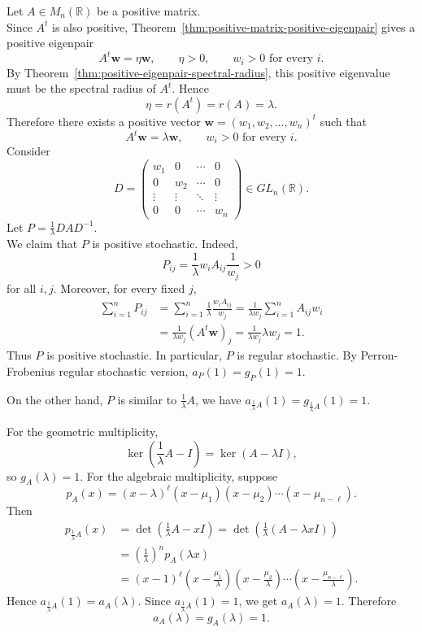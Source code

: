 \begin{pfbox}
Let $A\in M_n(\mathbb{R})$ be a positive matrix.\\
Since $A^t$ is also positive, Theorem~\eqref{thm:positive-matrix-positive-eigenpair} gives a positive eigenpair
\[
A^t\mathbf{w}
=
\eta\mathbf{w},
\qquad
\eta>0,
\qquad
w_i>0
\text{ for every }i.
\]
By Theorem~\eqref{thm:positive-eigenpair-spectral-radius}, this positive eigenvalue must be the spectral radius of $A^t$. Hence
\[
\eta
=
r(A^t)
=
r(A)
=
\lambda.
\]
Therefore there exists a positive vector $\mathbf{w}=(w_1,w_2,\dots,w_n)^t$ such that
\[
A^t\mathbf{w}
=
\lambda\mathbf{w},
\qquad
w_i>0
\text{ for every }i.
\]
Consider
\[
D
=
\begin{pmatrix}
w_1 & 0 & \cdots & 0\\
0 & w_2 & \cdots & 0\\
\vdots & \vdots & \ddots & \vdots\\
0 & 0 & \cdots & w_n
\end{pmatrix}
\in GL_n(\mathbb{R}).
\]
Let $P=\frac{1}{\lambda}DAD^{-1}$.\\
We claim that $P$ is positive stochastic. Indeed,
\[
P_{ij}
=
\frac{1}{\lambda}w_iA_{ij}\frac{1}{w_j}
>
0
\]
for all $i,j$. Moreover, for every fixed $j$,
\[
\begin{aligned}
\sum_{i=1}^n P_{ij}
&=
\sum_{i=1}^n \frac{1}{\lambda}\frac{w_iA_{ij}}{w_j}
=
\frac{1}{\lambda w_j}\sum_{i=1}^n A_{ij}w_i\\
&=
\frac{1}{\lambda w_j}(A^t\mathbf{w})_j
=
\frac{1}{\lambda w_j}\lambda w_j
=
1.
\end{aligned}
\]
Thus $P$ is positive stochastic. In particular, $P$ is regular stochastic. By Perron-Frobenius regular stochastic version, $a_P(1)=g_P(1)=1$.

On the other hand, $P$ is similar to $\frac{1}{\lambda}A$, we have $a_{\frac{1}{\lambda}A}(1)=g_{\frac{1}{\lambda}A}(1)=1$.

For the geometric multiplicity,
\[
\ker\left(\frac{1}{\lambda}A-I\right)
=
\ker(A-\lambda I),
\]
so $g_A(\lambda)=1$. For the algebraic multiplicity, suppose
\[
p_A(x)
=
(x-\lambda)^\ell(x-\mu_1)(x-\mu_2)\cdots(x-\mu_{n-\ell}).
\]
Then
\[
\begin{aligned}
p_{\frac{1}{\lambda}A}(x)
&=
\det\left(\frac{1}{\lambda}A-xI\right)
=
\det\left(\frac{1}{\lambda}(A-\lambda xI)\right)\\
&=
\left(\frac{1}{\lambda}\right)^n p_A(\lambda x)\\
&=
(x-1)^\ell
\left(x-\frac{\mu_1}{\lambda}\right)
\left(x-\frac{\mu_2}{\lambda}\right)
\cdots
\left(x-\frac{\mu_{n-\ell}}{\lambda}\right).
\end{aligned}
\]
Hence $a_{\frac{1}{\lambda}A}(1)=a_A(\lambda)$. Since $a_{\frac{1}{\lambda}A}(1)=1$, we get $a_A(\lambda)=1$. Therefore
\[
a_A(\lambda)=g_A(\lambda)=1.
\]
\end{pfbox}


